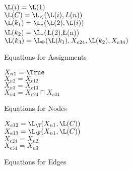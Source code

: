 \begin{figure}%
\begin{programa}
\Tb $\L(i) = \L(1)$ \\
\Tb $\L(C) = \L_{<}(\L(i),L(n)) $ \\
\Tb $\L(k_1) =  \L_{*}(\L(2), \L(i))$ \\
\Tb $\L(k_2) = \L_{*}($\L(2),\L(n)) \\
\Tb $\L(k_3) = \L_{\Phi}(\L(k_1), X_{e24}, \L(k_2), X_{e34})$ \\
\end{programa}

\caption{Equations for Assignments}
\label{fig:equations-assignments}
\end{figure}

\begin{figure}%
\begin{programa}
\Tb $X_{n1} = \True $ \\
\Tb $X_{n2} = X_{e12} $ \\
\Tb $X_{n3} = X_{e13} $ \\
\Tb $X_{n4} = X_{e24} \sqcap X_{e34} $ \\
\end{programa}
\caption{Equations for Nodes}
\label{fig:equations-nodes}
\end{figure}


\begin{figure}%
\begin{programa}
\Tb $X_{e12} = \L_{\T}(X_{n1},\L(C)) $ \\
\Tb $X_{e13} = \L_{\F}(X_{n1},\L(C)) $ \\
\Tb $X_{e24} = X_{n2}$  \\
\Tb $X_{e34} = X_{n3} $ \\
\end{programa}
\caption{Equations for Edges}
\label{fig:equations-edges}
\end{figure}




